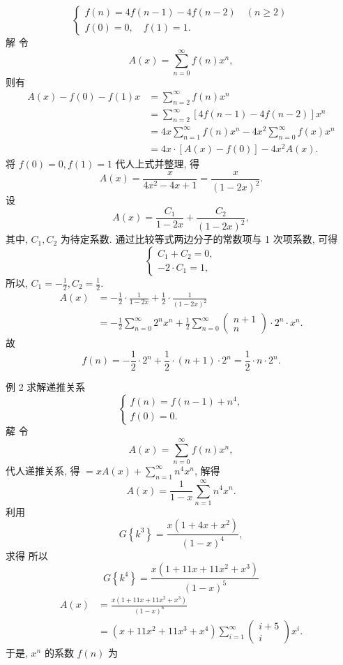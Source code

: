 \documentclass{report}
\begin{document}
$$
\left\{\begin{array}{l}
	f(n)=4 f(n-1)-4 f(n-2) \quad(n \geqslant 2) \\
	f(0)=0, \quad f(1)=1 .
\end{array}\right.
$$
解 令
$$
A(x)=\sum_{n=0}^{\infty} f(n) x^n,
$$
则有
$$
\begin{aligned}
	A(x)-f(0)-f(1) x &=\sum_{n=2}^{\infty} f(n) x^n \\
	&=\sum_{n=2}^{\infty}[4 f(n-1)-4 f(n-2)] x^n \\
	&=4 x \sum_{n=1}^{\infty} f(n) x^n-4 x^2 \sum_{n=0}^{\infty} f(x) x^n \\
	&=4 x \cdot[A(x)-f(0)]-4 x^2 A(x) .
\end{aligned}
$$
将 $f(0)=0, f(1)=1$ 代人上式并整理, 得
$$
A(x)=\frac{x}{4 x^2-4 x+1}=\frac{x}{(1-2 x)^2} .
$$
设
$$
A(x)=\frac{C_1}{1-2 x}+\frac{C_2}{(1-2 x)^2},
$$
其中, $C_1, C_2$ 为待定系数. 通过比较等式两边分子的常数项与 1 次项系数, 可得
$$
\left\{\begin{array}{l}
	C_1+C_2=0, \\
	-2 \cdot C_1=1,
\end{array}\right.
$$
所以, $C_1=-\frac{1}{2}, C_2=\frac{1}{2}$.
$$
\begin{aligned}
	A(x) &=-\frac{1}{2} \cdot \frac{1}{1-2 x}+\frac{1}{2} \cdot \frac{1}{(1-2 x)^2} \\
	&=-\frac{1}{2} \sum_{n=0}^{\infty} 2^n x^n+\frac{1}{2} \sum_{n=0}^{\infty}\left(\begin{array}{c}
		n+1 \\
		n
	\end{array}\right) \cdot 2^n \cdot x^n .
\end{aligned}
$$
故
$$
f(n)=-\frac{1}{2} \cdot 2^n+\frac{1}{2} \cdot(n+1) \cdot 2^n=\frac{1}{2} \cdot n \cdot 2^n .
$$

例 2 求解递推关系
$$
\left\{\begin{array}{l}
	f(n)=f(n-1)+n^4, \\
	f(0)=0 .
\end{array}\right.
$$
薢 令
$$
A(x)=\sum_{n=0}^{\infty} f(n) x^n,
$$
代人递推关系, 得
$=x A(x)+\sum_{n=1}^{\infty} n^4 x^n$,
解得
$$
A(x)=\frac{1}{1-x} \sum_{n=1}^{\infty} n^4 x^n .
$$
利用
$$
G\left\{k^3\right\}=\frac{x\left(1+4 x+x^2\right)}{(1-x)^4},
$$
求得
所以
$$
G\left\{k^4\right\}=\frac{x\left(1+11 x+11 x^2+x^3\right)}{(1-x)^5}
$$
$$
\begin{aligned}
	A(x) &=\frac{x\left(1+11 x+11 x^2+x^3\right)}{(1-x)^6} \\
	&=\left(x+11 x^2+11 x^3+x^4\right) \sum_{i=1}^{\infty}\left(\begin{array}{c}
		i+5 \\
		i
	\end{array}\right) x^i .
\end{aligned}
$$
于是, $x^n$ 的系数 $f(n)$ 为
\end{document}
